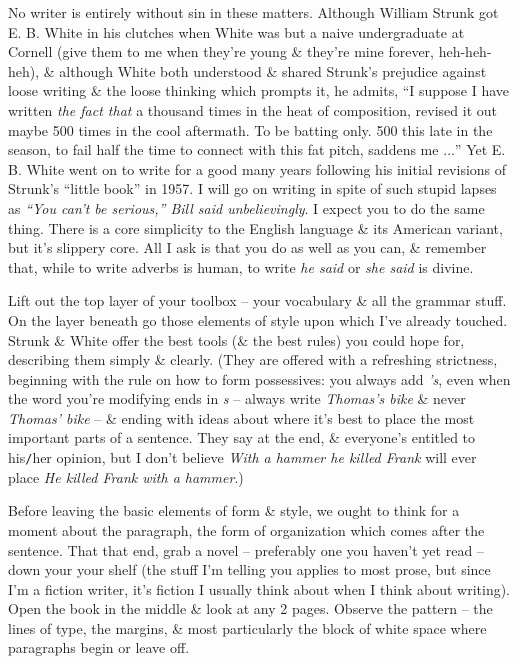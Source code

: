 \documentclass{article}
\numberwithin{equation}{section}
\begin{document}
No writer is entirely without sin in these matters. Although William Strunk got E. B. White in his clutches when White was but a naive undergraduate at Cornell (give them to me when they're young \& they're mine forever, heh-heh-heh), \& although White both understood \& shared Strunk's prejudice against loose writing \& the loose thinking which prompts it, he admits, ``I suppose I have written \textit{the fact that} a thousand times in the heat of composition, revised it out maybe 500 times in the cool aftermath. To be batting only. 500 this late in the season, to fail half the time to connect with this fat pitch, saddens me $\ldots$'' Yet E. B. White went on to write for a good many years following his initial revisions of Strunk's ``little book'' in 1957. I will go on writing in spite of such stupid lapses as \textit{``You can't be serious,'' Bill said unbelievingly}. I expect you to do the same thing. There is a core simplicity to the English language \& its American variant, but it's slippery core. All I ask is that you do as well as you can, \& remember that, while to write adverbs is human, to write \textit{he said} or \textit{she said} is divine.

 Lift out the top layer of your toolbox -- your vocabulary \& all the grammar stuff. On the layer beneath go those elements of style upon which I've already touched. Strunk \& White offer the best tools (\& the best rules) you could hope for, describing them simply \& clearly. (They are offered with a refreshing strictness, beginning with the rule on how to form possessives: you always add \textit{'s}, even when the word you're modifying ends in \textit{s} -- always write \textit{Thomas's bike} \& never \textit{Thomas' bike} -- \& ending with ideas about where it's best to place the most important parts of a sentence. They say at the end, \& everyone's entitled to his{\tt/}her opinion, but I don't believe \textit{With a hammer he killed Frank} will ever place \textit{He killed Frank with a hammer}.)

Before leaving the basic elements of form \& style, we ought to think for a moment about the paragraph, the form of organization which comes after the sentence. That that end, grab a novel -- preferably one you haven't yet read -- down your your shelf (the stuff I'm telling you applies to most prose, but since I'm a fiction writer, it's fiction I usually think about when I think about writing). Open the book in the middle \& look at any 2 pages. Observe the pattern -- the lines of type, the margins, \& most particularly the block of white space where paragraphs begin or leave off.
\end{document}
